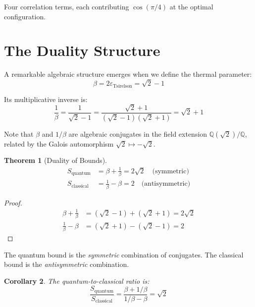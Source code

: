 \documentclass[12pt,a4paper]{article}
\newtheorem{theorem}{Theorem}[section]
\newtheorem{corollary}[theorem]{Corollary}
\newcommand{\eps}{\varepsilon}
\begin{document}
Four correlation terms, each contributing $\cos(\pi/4)$ at the optimal configuration.

\section{The Duality Structure}

A remarkable algebraic structure emerges when we define the thermal parameter:
\begin{equation}
\beta = 2\eps_{\text{Tsirelson}} = \sqrt{2} - 1
\end{equation}

Its multiplicative inverse is:
\begin{equation}
\frac{1}{\beta} = \frac{1}{\sqrt{2}-1} = \frac{\sqrt{2}+1}{(\sqrt{2}-1)(\sqrt{2}+1)} = \sqrt{2} + 1
\end{equation}

Note that $\beta$ and $1/\beta$ are algebraic conjugates in the field extension $\mathbb{Q}(\sqrt{2})/\mathbb{Q}$, related by the Galois automorphism $\sqrt{2} \mapsto -\sqrt{2}$.

\begin{theorem}[Duality of Bounds]
\begin{align}
S_{\text{quantum}} &= \beta + \frac{1}{\beta} = 2\sqrt{2} \quad \text{(symmetric)} \\
S_{\text{classical}} &= \frac{1}{\beta} - \beta = 2 \quad \text{(antisymmetric)}
\end{align}
\end{theorem}

\begin{proof}
\begin{align}
\beta + \frac{1}{\beta} &= (\sqrt{2}-1) + (\sqrt{2}+1) = 2\sqrt{2} \\
\frac{1}{\beta} - \beta &= (\sqrt{2}+1) - (\sqrt{2}-1) = 2
\end{align}
\end{proof}

The quantum bound is the \emph{symmetric} combination of conjugates.
The classical bound is the \emph{antisymmetric} combination.

\begin{corollary}
The quantum-to-classical ratio is:
\begin{equation}
\frac{S_{\text{quantum}}}{S_{\text{classical}}} = \frac{\beta + 1/\beta}{1/\beta - \beta} = \sqrt{2}
\end{equation}
\end{corollary}
\end{document}
